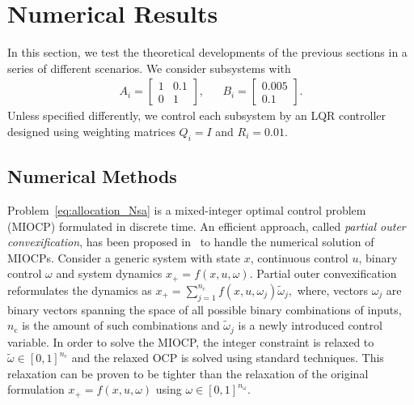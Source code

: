 \documentclass[letterpaper, 10 pt, conference]{ieeeconf}  %
\newcommand {\matr}[2]{\left[\begin{array}{#1}#2\end{array}\right]}
\begin{document}
%
%
%
%
\section{Numerical Results}
\label{sec:results}

In this section, we test the theoretical developments of the previous sections in a series of different scenarios.
We consider subsystems with 
\begin{align}
\label{eq:subsystems_example}	
A_i = \matr{cc}{1&0.1\\ 0 & 1}, && B_i = \matr{c}{0.005 \\0.1}.
\end{align}
Unless specified differently, we control each subsystem by an LQR controller designed using weighting matrices $Q_i=I$ and $R_i=0.01$. %

%
%
%
%
\subsection{Numerical Methods}
\label{sec:computations}

Problem~\eqref{eq:allocation_Nsa} is a mixed-integer optimal control problem (MIOCP) formulated in discrete time. An efficient approach, called \emph{partial outer convexification}, has been proposed in~\cite{Sager2009,Kirches2010y} to handle the numerical solution of MIOCPs. Consider a generic system with state $x$, continuous control $u$, binary control $\omega$ and system dynamics $x_+=f(x,u,\omega)$.
Partial outer convexification reformulates the dynamics as
$x_+=\sum_{j=1}^{n_\mathrm{c}} f(x,u,\omega_j)\tilde \omega_j,$
where, vectors $\omega_j$ are binary vectors spanning the space of all possible binary combinations of inputs, $n_\mathrm{c}$ is the amount of such combinations and $\tilde \omega_j$ is a newly introduced control variable. 
In order to solve the MIOCP, the integer constraint is relaxed to $\tilde \omega \in [0,1]^{n_\mathrm{c}}$ and the relaxed OCP is solved using standard techniques. This relaxation can be proven to be tighter than the relaxation of the original formulation $x_+=f(x,u,\omega)$ using $\omega \in [0,1]^{n_\mathrm{\omega}}$. 
\end{document}
